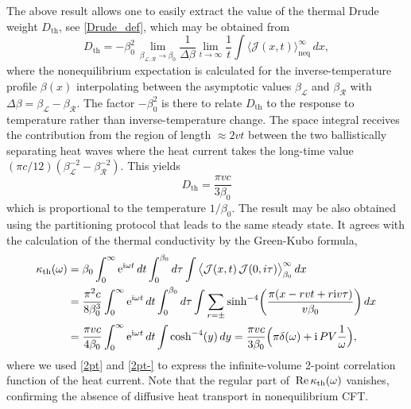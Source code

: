 \documentclass[12pt,a4paper]{article}
\newcommand{\ee}{{\rm e}}
\newcommand{\ii}{{\rm i}}
\newcommand{\cJ}{\mathcal{J}}
\newcommand{\cL}{\mathcal{L}}
\newcommand{\cR}{\mathcal{R}}
\theoremstyle{definition}
\theoremstyle{remark}
\begin{document}
The above result allows one to easily extract the value of the thermal Drude weight $D_{\text{th}}$, see \eqref{Drude_def},
which may be obtained \cite{DSp,VKM} from
%
\begin{equation}
\label{Drude}
D_{\text{th}}
= -\beta_0^2\,\lim\limits_{\beta_{\cL,\cR}\to\beta_0}\frac{1}{\Delta\beta}
	\lim_{t\to\infty} \frac{1}{t}
	\int \big\langle\cJ(x,t) \big\rangle^\infty_{\text{neq}} \, dx,
\end{equation}
%
where the nonequilibrium expectation is calculated for the inverse-temperature profile $\beta(x)$ interpolating between the asymptotic values $\beta_{\cL}$ and $\beta_{\cR}$ with $\Delta\beta=\beta_\cL-\beta_\cR$.
The factor $-\beta_0^2$ is there to relate $D_{\text{th}}$ to the response to temperature rather than inverse-temperature change.
The space integral receives the contribution from the region of length $\approx2vt$ between the two ballistically separating heat waves where the heat current takes the long-time
value $({\pi c}/{12})(\beta_{\cL}^{-2}-\beta_{\cR}^{-2})$.
This yields
%
\begin{equation}
D_{\text{th}} = \frac{\pi v c}{3\beta_0}
\end{equation}
%
which is proportional to the temperature $1/\beta_0$. The
result may be also obtained using the partitioning protocol that leads
to the same steady state. It agrees with the calculation of the thermal
conductivity by the Green-Kubo formula,
%
\begin{align}
\kappa_{\text{th}}(\omega)
& = \beta_0\int_0^\infty\ee^{\ii\omega t}\,dt\int_0^{\beta_0} d\tau
\int\big\langle\cJ(x,t)\,\cJ(0,i\tau)\big\rangle^\infty_{\beta_0}\,dx \nonumber \\
& = \frac{\pi^2c}{8\beta_0^3}\int_0^\infty\ee^{\ii\omega t}\,dt\int_0^{\beta_0} d\tau
\int\sum\limits_{r=\pm}\sinh^{-4} \biggl (\frac{\pi(x-rvt+r\ii v\tau)}{v\beta_0}
\biggr) \,dx \nonumber \\
& = \frac{\pi vc}{4\beta_0}\int_0^\infty\ee^{\ii\omega t}\,dt\int\cosh^{-4}(y)\,dy
	= \frac{\pi vc}{3\beta_0}\Bigl(\pi\delta(\omega)+\ii\,PV\frac{1}{\omega}\Bigr),
\end{align}
%
where we used \eqref{2pt} and \eqref{2pt-} to express the infinite-volume
2-point correlation function of the heat current. Note that the regular part
of $\,{\rm Re}\,\kappa_{\text{th}}(\omega)$ vanishes, confirming the absence of
diffusive heat transport in nonequilibrium CFT. 

\end{document}
